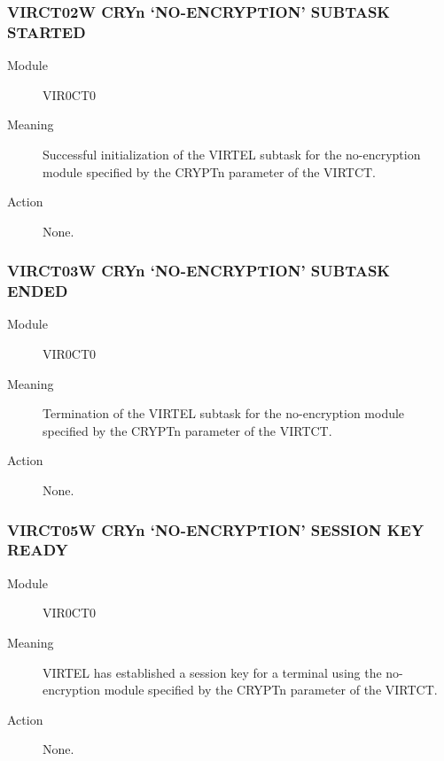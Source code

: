 \documentclass[letterpaper,10pt,english]{sphinxmanual}
\begin{document}
\subsubsection{VIRCT02W CRYn ‘NO-ENCRYPTION’ SUBTASK STARTED}
\label{\detokenize{messages:virct02w-cryn-no-encryption-subtask-started}}\begin{description}
\item[{Module}] \leavevmode
VIR0CT0

\item[{Meaning}] \leavevmode
Successful initialization of the VIRTEL subtask for the no-encryption module specified by the CRYPTn parameter of the VIRTCT.

\item[{Action}] \leavevmode
None.

\end{description}


\subsubsection{VIRCT03W CRYn ‘NO-ENCRYPTION’ SUBTASK ENDED}
\label{\detokenize{messages:virct03w-cryn-no-encryption-subtask-ended}}\begin{description}
\item[{Module}] \leavevmode
VIR0CT0

\item[{Meaning}] \leavevmode
Termination of the VIRTEL subtask for the no-encryption module specified by the CRYPTn parameter of the VIRTCT.

\item[{Action}] \leavevmode
None.

\end{description}


\subsubsection{VIRCT05W CRYn ‘NO-ENCRYPTION’ SESSION KEY READY}
\label{\detokenize{messages:virct05w-cryn-no-encryption-session-key-ready}}\begin{description}
\item[{Module}] \leavevmode
VIR0CT0

\item[{Meaning}] \leavevmode
VIRTEL has established a session key for a terminal using the no-encryption module specified by the CRYPTn parameter of the VIRTCT.

\item[{Action}] \leavevmode
None.

\end{description}
\end{document}
